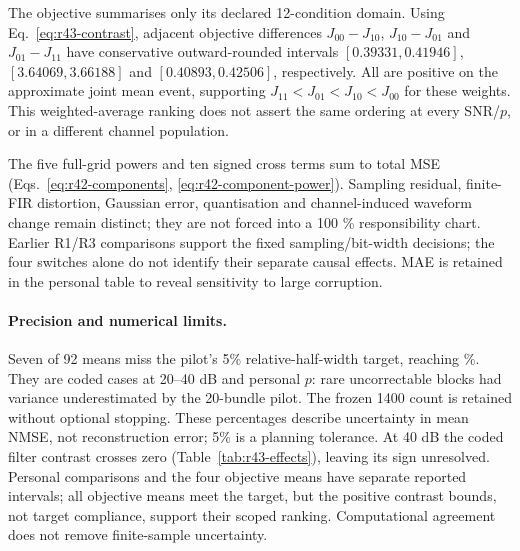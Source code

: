 The objective summarises only its declared 12-condition domain.
Using Eq.~\eqref{eq:r43-contrast}, adjacent objective differences
$J_{00}-J_{10}$, $J_{10}-J_{01}$ and $J_{01}-J_{11}$ have conservative
outward-rounded intervals $[0.39331,0.41946]$, $[3.64069,3.66188]$ and
$[0.40893,0.42506]$, respectively. All are positive on the approximate
joint mean event, supporting $J_{11}<J_{01}<J_{10}<J_{00}$ for these
weights. This weighted-average ranking does not assert the same ordering
at every SNR/$p$, or in a different channel population.

\begin{table}[htbp]
 \centering\small
 \caption{Configuration 11 full-grid component powers, including small terms, plus signed cross terms. Sampling-scale residuals here are numerical, not measurable aliasing.}
 \label{tab:r43-components}
 
 
 
\end{table}

\noindent\begin{minipage}{\linewidth}
The five full-grid powers and ten signed cross terms sum to total MSE
(Eqs.~\eqref{eq:r42-components}, \eqref{eq:r42-component-power}).
Sampling residual, finite-FIR distortion, Gaussian error, quantisation
and channel-induced waveform change remain distinct; they are not forced
into a 100 \% responsibility chart. Earlier R1/R3 comparisons support the
fixed sampling/bit-width decisions; the four switches alone do not
identify their separate causal effects. MAE is retained in the personal
table to reveal sensitivity to large corruption.
\end{minipage}\par

\paragraph{Precision and numerical limits.}
Seven of 92 means miss the pilot's 5\% relative-half-width target,
reaching \WMaxRelativePercent\%. They are coded cases at 20--40 dB and
personal $p$: rare uncorrectable blocks had variance underestimated by the
20-bundle pilot. The frozen 1400 count is retained without optional stopping.
These percentages describe uncertainty in mean NMSE, not reconstruction
error; 5\% is a planning tolerance. At 40 dB the coded filter contrast
crosses zero (Table~\ref{tab:r43-effects}), leaving its sign unresolved.
Personal comparisons and the four objective means have separate reported
intervals; all objective means meet the target, but the positive contrast
bounds, not target compliance, support their scoped ranking.
Computational agreement does not remove finite-sample uncertainty.

